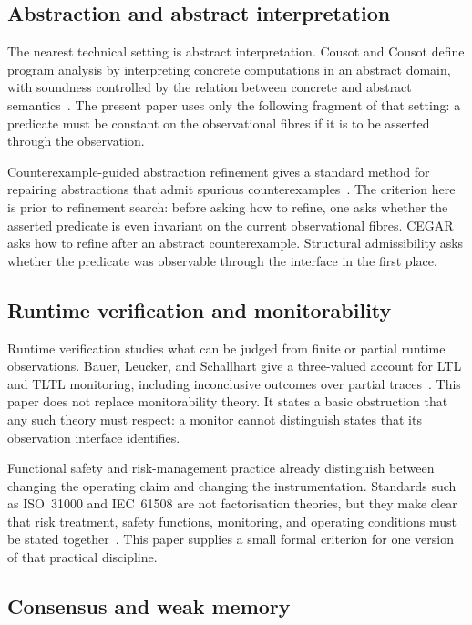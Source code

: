 \documentclass[a4paper,11pt]{article}
\begin{document}
\subsection{Abstraction and abstract interpretation}

The nearest technical setting is abstract interpretation. Cousot and Cousot
define program analysis by interpreting concrete computations in an abstract
domain, with soundness controlled by the relation between concrete and abstract
semantics~\cite{cousot1977abstract}. The present paper uses only the following
fragment of that setting: a predicate must be constant on the observational
fibres if it is to be asserted through the observation.

Counterexample-guided abstraction refinement gives a standard method for
repairing abstractions that admit spurious counterexamples~\cite{clarke2000cegar,clarke2003cegar}.
The criterion here is prior to refinement search: before asking how to refine,
one asks whether the asserted predicate is even invariant on the current
observational fibres. CEGAR asks how to refine after an abstract counterexample.
Structural admissibility asks whether the predicate was observable through the
interface in the first place.

\subsection{Runtime verification and monitorability}

Runtime verification studies what can be judged from finite or partial runtime
observations. Bauer, Leucker, and Schallhart give a three-valued account for LTL
and TLTL monitoring, including inconclusive outcomes over partial
traces~\cite{bauer2011runtime}. This paper does not replace monitorability theory.
It states a basic obstruction that any such theory must respect: a monitor cannot
distinguish states that its observation interface identifies.

Functional safety and risk-management practice already distinguish between
changing the operating claim and changing the instrumentation. Standards such
as ISO~31000 and IEC~61508 are not factorisation theories, but they make clear
that risk treatment, safety functions, monitoring, and operating conditions must
be stated together~\cite{iso31000,iec61508}. This paper supplies a small formal
criterion for one version of that practical discipline.

\subsection{Consensus and weak memory}
\end{document}
